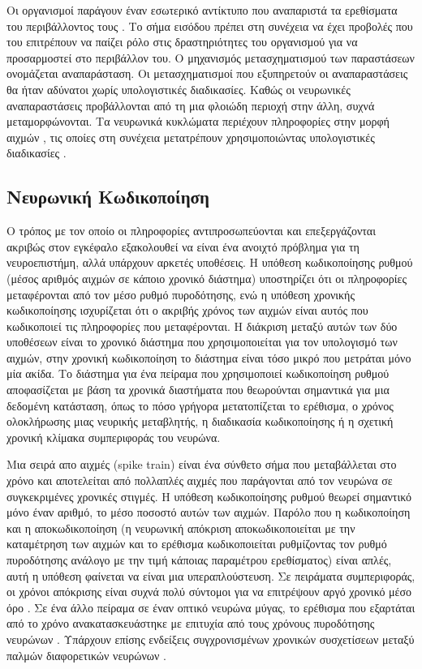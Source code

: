 \documentclass[12pt]{report}
\begin{document}
Οι οργανισμοί παράγουν έναν εσωτερικό αντίκτυπο που αναπαριστά τα ερεθίσματα του περιβάλλοντος τους \cite{Koch1994}. Το σήμα εισόδου πρέπει στη συνέχεια να έχει προβολές που του επιτρέπουν να παίζει ρόλο στις δραστηριότητες του οργανισμού για να προσαρμοστεί στο περιβάλλον του. Ο μηχανισμός μετασχηματισμού των παραστάσεων ονομάζεται αναπαράσταση. Οι μετασχηματισμοί που εξυπηρετούν οι αναπαραστάσεις θα ήταν αδύνατοι χωρίς υπολογιστικές διαδικασίες. Καθώς οι νευρωνικές αναπαραστάσεις προβάλλονται από τη μια φλοιώδη περιοχή στην άλλη, συχνά μεταμορφώνονται. Τα νευρωνικά κυκλώματα περιέχουν πληροφορίες στην μορφή αιχμών , τις οποίες στη συνέχεια μετατρέπουν χρησιμοποιώντας υπολογιστικές διαδικασίες \cite{decharms2000}. 

\subsection{Nευρωνική Κωδικοποίηση}

Ο τρόπος με τον οποίο οι πληροφορίες αντιπροσωπεύονται και επεξεργάζονται  ακριβώς στον εγκέφαλο εξακολουθεί να είναι ένα ανοιχτό πρόβλημα για τη νευροεπιστήμη, αλλά υπάρχουν αρκετές υποθέσεις. Η υπόθεση κωδικοποίησης ρυθμού (μέσος αριθμός αιχμών σε κάποιο χρονικό διάστημα) \cite{Salzman1992} \cite{Tovee1993} υποστηρίζει ότι οι πληροφορίες μεταφέρονται από τον μέσο ρυθμό πυροδότησης, ενώ η υπόθεση χρονικής κωδικοποίησης \cite{Bair1996} \cite{buracas1998} \cite{Rucci2018} ισχυρίζεται ότι ο ακριβής χρόνος των αιχμών είναι αυτός που κωδικοποιεί τις πληροφορίες που μεταφέρονται.
Η διάκριση μεταξύ αυτών των δύο υποθέσεων είναι το χρονικό διάστημα που χρησιμοποιείται για τον υπολογισμό των αιχμών, στην χρονική κωδικοποίηση το διάστημα είναι τόσο μικρό που μετράται μόνο μία ακίδα. Το διάστημα για ένα πείραμα που χρησιμοποιεί κωδικοποίηση ρυθμού αποφασίζεται με βάση τα χρονικά διαστήματα που θεωρούνται σημαντικά για μια δεδομένη κατάσταση, όπως το πόσο γρήγορα μετατοπίζεται το ερέθισμα, ο χρόνος ολοκλήρωσης μιας νευρικής μεταβλητής, η διαδικασία κωδικοποίησης ή η σχετική χρονική κλίμακα συμπεριφοράς του νευρώνα.

Μια σειρά απο αιχμές (\textlatin{spike train}) είναι ένα σύνθετο σήμα που μεταβάλλεται στο χρόνο και αποτελείται από πολλαπλές αιχμές που παράγονται από τον νευρώνα σε συγκεκριμένες χρονικές στιγμές. Η υπόθεση κωδικοποίησης ρυθμού θεωρεί σημαντικό μόνο έναν αριθμό, το μέσο ποσοστό αυτών των αιχμών. Παρόλο που η κωδικοποίηση και η αποκωδικοποίηση (η νευρωνική απόκριση αποκωδικοποιείται με την καταμέτρηση των αιχμών και το ερέθισμα κωδικοποιείται ρυθμίζοντας τον ρυθμό πυροδότησης ανάλογο με την τιμή κάποιας παραμέτρου ερεθίσματος) είναι απλές, αυτή η υπόθεση φαίνεται να είναι μια υπεραπλούστευση. Σε πειράματα συμπεριφοράς, οι χρόνοι απόκρισης είναι συχνά πολύ σύντομοι για να επιτρέψουν αργό χρονικό μέσο όρο \cite{thorpe1996}. Σε ένα άλλο πείραμα σε έναν οπτικό νευρώνα μύγας, το ερέθισμα που εξαρτάται από το χρόνο ανακατασκευάστηκε με επιτυχία από τους χρόνους πυροδότησης νευρώνων \cite{Bialek1991}. Υπάρχουν επίσης ενδείξεις συγχρονισμένων χρονικών συσχετίσεων μεταξύ παλμών διαφορετικών νευρώνων \cite{Lestienne1996}. 
\end{document}
